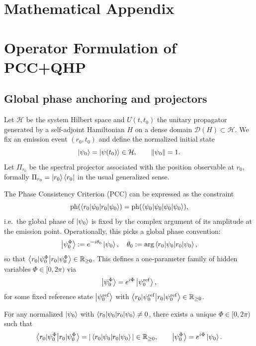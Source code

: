 \documentclass[11pt]{article}
\begin{document}
\begin{itemize}[leftmargin=*]
\appendix
\section*{Mathematical Appendix}

\section{Operator Formulation of PCC+QHP}

\subsection{Global phase anchoring and projectors}

Let \(\mathcal{H}\) be the system Hilbert space and \(U(t,t_0)\) the unitary propagator generated by a self-adjoint Hamiltonian \(H\) on a dense domain \(\mathcal{D}(H)\subset\mathcal{H}\).
We fix an emission event \((r_0,t_0)\) and define the normalized initial state
\[
\ket{\psi_0} = \ket{\psi(t_0)}\in\mathcal{H},\qquad \|\psi_0\|=1.
\]
Let \(\Pi_{r_0}\) be the spectral projector associated with the position observable at \(r_0\), formally \(\Pi_{r_0}=\ket{r_0}\bra{r_0}\) in the usual generalized sense.

The Phase Consistency Criterion (PCC) can be expressed as the constraint
\begin{equation}
\mathrm{ph}(\braket{r_0|\psi_0}) = \mathrm{ph}(\braket{\psi_0|\psi_0}),\label{eq:PCC-operator}
\end{equation}
i.e.\ the global phase of \(\ket{\psi_0}\) is fixed by the complex argument of its amplitude at the emission point.
Operationally, this picks a global phase convention:
\[
\ket{\psi_0^\Phi} := e^{-i\theta_0}\ket{\psi_0},\quad
\theta_0 := \arg\braket{r_0|\psi_0},
\]
so that \(\braket{r_0|\psi_0^\Phi}\in\mathbb{R}_{\ge 0}\).
This defines a one-parameter family of hidden variables \(\Phi\in[0,2\pi)\) via
\[
\ket{\psi_0^\Phi} = e^{i\Phi}\ket{\psi_0^\mathrm{ref}},
\]
for some fixed reference state \(\ket{\psi_0^\mathrm{ref}}\) with \(\braket{r_0|\psi_0^\mathrm{ref}}\in\mathbb{R}_{\ge 0}\).

\begin{lemma}
For any normalized \(\ket{\psi_0}\) with \(\braket{r_0|\psi_0}\neq 0\), there exists a unique \(\Phi\in[0,2\pi)\) such that
\[
\braket{r_0|\psi_0^\Phi} = |\braket{r_0|\psi_0}|\in\mathbb{R}_{\ge 0},\qquad
\ket{\psi_0^\Phi} = e^{i\Phi}\ket{\psi_0}.
\]
\end{lemma}


\end{itemize}
\end{document}
